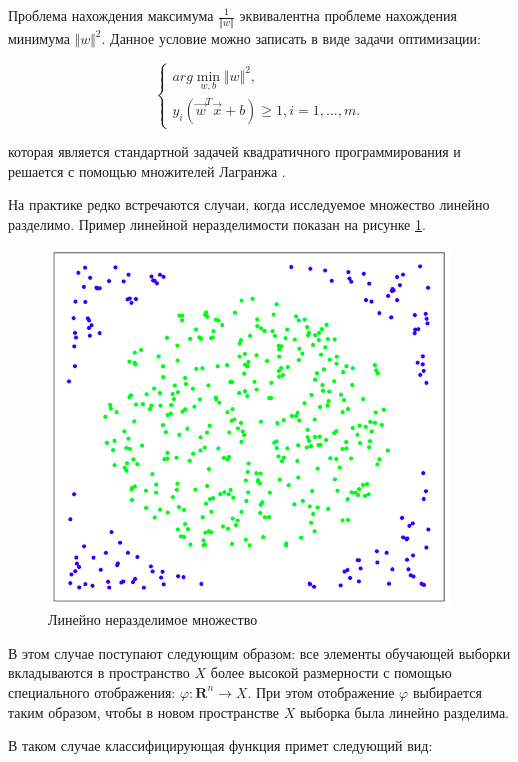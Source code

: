 Проблема нахождения максимума $\frac{1}{\Vert w \Vert}$ эквивалентна проблеме нахождения минимума ${\Vert w \Vert}^2$.
Данное условие можно записать в виде задачи оптимизации:

\begin{equation}
\left\{ \begin{array}{ll}
 arg\min_{w,b} {\Vert w \Vert}^2,\\
y_i(\vec w^T \vec x + b) \geq 1, i = 1,...,m.
\end{array} \right.
\end{equation}

\vspace{\baselineskip}
которая является стандартной задачей квадратичного программирования и решается с помощью множителей Лагранжа \cite{Lagrange}.

На практике редко встречаются случаи, когда исследуемое множество линейно разделимо. Пример линейной неразделимости показан на рисунке \ref{anal:non-linear}.

\begin{figure}[h!]
	\centering
	\includegraphics[scale=0.7]{inc/img/non-linear.png}
	\caption{Линейно неразделимое множество}
	\label{anal:non-linear}
\end{figure}

В этом случае поступают следующим образом: все элементы обучающей выборки вкладываются в пространство $X$ более высокой размерности с помощью специального отображения: $\varphi: \mathbf{R}^n \to X$. При этом отображение $\varphi$ выбирается таким образом, чтобы в новом пространстве $X$ выборка была линейно разделима.

В таком случае классифицирующая функция примет следующий вид:

